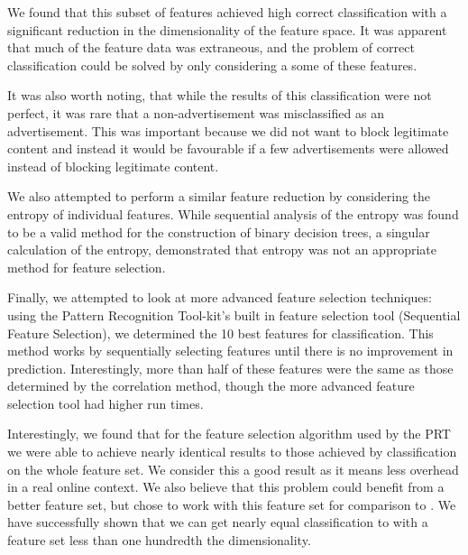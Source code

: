 We found that this subset of features achieved high correct classification with a significant reduction in the dimensionality of the feature space. It was apparent that much of the feature data was extraneous, and the problem of correct classification could be solved by only considering a some of these features.

It was also worth noting, that while the results of this classification were not perfect, it was rare that a non-advertisement was misclassified as an advertisement. This was important because we did not want to block legitimate content and instead it would be favourable if a few advertisements were allowed instead of blocking legitimate content. 

We also attempted to perform a similar feature reduction by considering the entropy of individual features. While sequential analysis of the entropy was found to be a valid method for the construction of binary decision trees, a singular calculation of the entropy, demonstrated that entropy was not an appropriate method for feature selection.

Finally, we attempted to look at more advanced feature selection techniques: using the Pattern Recognition Tool-kit's built in feature selection tool (Sequential Feature Selection), we determined the 10 best features for classification. This method works by sequentially selecting features until there is no improvement in prediction. Interestingly, more than half of these features were the same as those determined by the correlation method, though the more advanced feature selection tool had higher run times.

Interestingly, we found that for the feature selection algorithm used by the PRT we were able to achieve nearly identical results to those achieved by classification on the whole feature set. We consider this a good result as it means less overhead in a real online context. We also believe that this problem could benefit from a better feature set, but chose to work with this feature set for comparison to \cite{adeater}. We have successfully shown that we can get nearly equal classification to \cite{adeater} with a feature set less than one hundredth the dimensionality. 